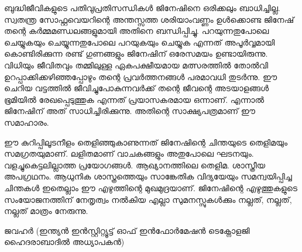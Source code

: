 ബുദ്ധിജീവികളുടെ പതിവുപ്രതിസന്ധികള്‍ ജിനേഷിനെ ഒരിക്കലും ബാധിച്ചില്ല. സ്വതന്ത്ര സോഫ്റ്റവെയറിന്റെ അന്തസ്സത്ത ശരിയാംവണ്ണം 
ഉള്‍ക്കൊണ്ട ജിനേഷ് തന്റെ കര്‍മ്മമണ്ഡലങ്ങളുമായി അതിനെ ബന്ധിപ്പിച്ചു. പറയുന്നതുപോലെ ചെയ്യുകയും ചെയ്യുന്നതുപോലെ പറയുകയും 
ചെയ്യുക എന്നത് അപൂര്‍വ്വമായി കൊണ്ടിരിക്കുന്ന രണ്ട് ഗുണങ്ങളും ജിനേഷിന് ഒരേസമയം ഉണ്ടായിരുന്നു. വിധിയും ജീവിതവും തമ്മിലുള്ള 
ഏകപക്ഷീയമായ മത്സരത്തില്‍ തോല്‍വി ഉറപ്പാക്കിക്കഴിഞ്ഞപ്പോഴും  തന്റെ പ്രവര്‍ത്തനങ്ങള്‍ പരമാവധി തുടര്‍ന്നു.  ഈ ചെറിയ വട്ടത്തില്‍ 
ജീവിച്ചുപോകുന്നവര്‍ക്ക് തന്റെ ജീവന്റെ അടയാളങ്ങള്‍ ഭൂമിയില്‍ രേഖപ്പെടുത്തുക എന്നത് പ്രയാസകരമായ ഒന്നാണ്. എന്നാല്‍ ജിനേഷിന് 
അത് സാധിച്ചിരിക്കുന്നു. അതിന്റെ സാക്ഷ്യപത്രമാണ്‌ ഈ സമാഹാരം.

ഈ കുറിപ്പിലൂടനീളം തെളിഞ്ഞുകാണുന്നത് ജിനേഷിന്റെ ചിന്തയുടെ തെളിമയും സമഗ്രതയുമാണ്. ലളിതമാണ് വാചകങ്ങളും അതുപോലെ ഘടനയും. 
വളച്ചുകെട്ടലില്ലാത്ത പ്രയോഗങ്ങള്‍. ആഖ്യാനത്തിലെ തെളിമ. ശാസ്ത്രീയ അപഗ്രഥനം. ആധുനിക ശാസ്ത്രത്തെയും സാങ്കേതിക വിദ്യയേയും സമന്വയിപ്പിച്ച 
ചിന്തകള്‍ ഇതെല്ലാം ഈ എഴുത്തിന്റെ മുഖമുദ്രയാണ്. ജിനേഷിന്റെ എഴുത്തുകളുടെ സംയോജനത്തിന് നേതൃത്വം നല്‍കിയ എല്ലാ സുമനസ്സുകള്‍ക്കും 
നല്ലത്, നല്ലത്, നല്ലത് മാത്രം നേരുന്നു. 

\hspace*{2em}ജവഹര്‍ (ഇന്ത്യന്‍ ഇന്‍സ്റ്റിറ്റ്യൂട്ട് ഓഫ് ഇന്‍ഫോര്‍മേഷന്‍ ടെക്നോളജി ഹൈദരാബാദില്‍ അധ്യാപകന്‍) 
\newpage

